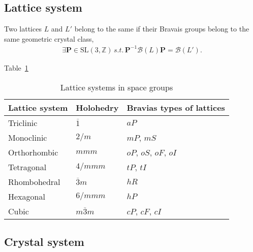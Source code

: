 
\subsection{\label{sec:lattice-system}Lattice system}

\begin{screen}
  \begin{defn}
    Two lattices $L$ and $L'$ belong to the same  if their Bravais groups belong to the same geometric crystal class,
    \begin{align}
      \exists \bm{P} \in \mathrm{SL}(3, \mathbb{Z}) \,s.t.\, \bm{P}^{-1} \mathcal{B}(L) \bm{P} = \mathcal{B}(L').
    \end{align}
  \end{defn}
\end{screen}


Table~\ref{tab:lattice_system}

\begin{table}[htb]
  \centering
  \caption{Lattice systems in space groups}
  \label{tab:lattice_system}
  \begin{tabular}[h]{lll}
    \hline
    Lattice system & Holohedry & Bravias types of lattices \\ \hline
    Triclinic    & $\overline{1}$   & $aP$                   \\
    Monoclinic   & $2/m$            & $mP$, $mS$             \\
    Orthorhombic & $mmm$            & $oP$, $oS$, $oF$, $oI$ \\
    Tetragonal   & $4/mmm$          & $tP$, $tI$             \\
    Rhombohedral & $\overline{3}m$  & $hR$                   \\
    Hexagonal    & $6/mmm$          & $hP$                   \\
    Cubic        & $m\overline{3}m$ & $cP$, $cF$, $cI$       \\ \hline
  \end{tabular}
\end{table}

\subsection{\label{sec:crystal-system}Crystal system}

